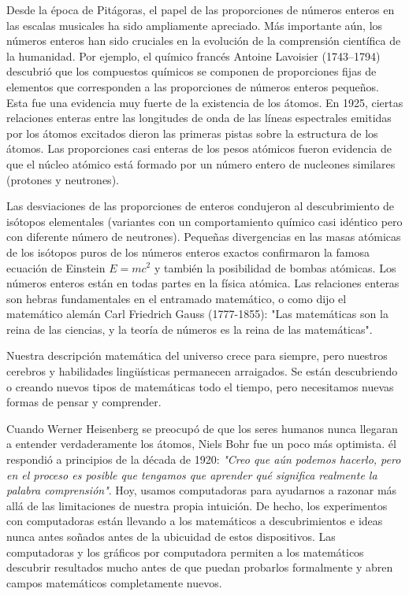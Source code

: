 \documentclass{article}
\begin{document}
Desde la \'epoca de Pit\'agoras, el papel de las proporciones de n\'umeros enteros en
las escalas musicales ha sido ampliamente apreciado. M\'as importante a\'un, los
n\'umeros enteros han sido cruciales en la evoluci\'on de la comprensi\'on cient\'ifica
de la humanidad. Por ejemplo, el qu\'imico franc\'es Antoine Lavoisier (1743–1794)
descubri\'o que los compuestos qu\'imicos se componen de proporciones fijas de
elementos que corresponden a las proporciones de n\'umeros enteros peque\~nos. Esta
fue una evidencia muy fuerte de la existencia de los \'atomos. En 1925, ciertas
relaciones enteras entre las longitudes de onda de las l\'ineas espectrales
emitidas por los \'atomos excitados dieron las primeras pistas sobre la estructura
de los \'atomos. Las proporciones casi enteras de los pesos at\'omicos fueron
evidencia de que el n\'ucleo at\'omico est\'a formado por un n\'umero entero de
nucleones similares (protones y neutrones).

Las desviaciones de las proporciones de enteros condujeron al descubrimiento de
is\'otopos elementales (variantes con un comportamiento qu\'imico casi id\'entico pero
con diferente n\'umero de neutrones). Peque\~nas divergencias en las masas at\'omicas
de los is\'otopos puros de los n\'umeros enteros exactos confirmaron la famosa
ecuaci\'on de Einstein $E = mc^2$ y tambi\'en la posibilidad de bombas at\'omicas. Los
n\'umeros enteros est\'an en todas partes en la f\'isica at\'omica. Las relaciones
enteras son hebras fundamentales en el entramado matem\'atico, o como dijo el
matem\'atico alem\'an Carl Friedrich Gauss (1777-1855): "Las matem\'aticas son la
reina de las ciencias, y la teor\'ia de n\'umeros es la reina de las matem\'aticas".

Nuestra descripci\'on matem\'atica del universo crece para siempre, pero nuestros
cerebros y habilidades lingü\'isticas permanecen arraigados. Se est\'an descubriendo
o creando nuevos tipos de matem\'aticas todo el tiempo, pero necesitamos nuevas
formas de pensar y comprender. 

Cuando Werner Heisenberg se preocup\'o de que los seres humanos nunca llegaran a
entender verdaderamente los \'atomos, Niels Bohr fue un poco m\'as optimista. \'el
respondi\'o a principios de la d\'ecada de 1920: \textit{"Creo que a\'un podemos
hacerlo, pero en el proceso es posible que tengamos que aprender qu\'e significa
realmente la palabra comprensi\'on"}. Hoy, usamos computadoras para ayudarnos a
razonar m\'as all\'a de las limitaciones de nuestra propia intuici\'on. De hecho, los
experimentos con computadoras est\'an llevando a los matem\'aticos a descubrimientos
e ideas nunca antes so\~nados antes de la ubicuidad de estos dispositivos. Las
computadoras y los gr\'aficos por computadora permiten a los matem\'aticos descubrir
resultados mucho antes de que puedan probarlos formalmente y abren campos
matem\'aticos completamente nuevos. 
\end{document}
